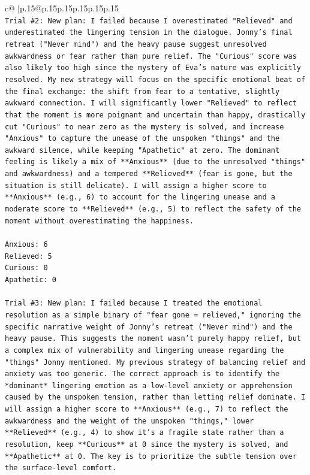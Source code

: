 \documentclass{article}
\begin{document}
{\begin{supertabular}{c@{$\;$}|p{.15\linewidth}@{}p{.15\linewidth}p{.15\linewidth}p{.15\linewidth}p{.15\linewidth}p{.15\linewidth}}
{{{\\ 
\texttt{Trial \#2: New plan: I failed because I overestimated "Relieved" and underestimated the lingering tension in the dialogue. Jonny's final retreat ("Never mind") and the heavy pause suggest unresolved awkwardness or fear rather than pure relief. The "Curious" score was also likely too high since the mystery of Eva's nature was explicitly resolved. My new strategy will focus on the specific emotional beat of the final exchange: the shift from fear to a tentative, slightly awkward connection. I will significantly lower "Relieved" to reflect that the moment is more poignant and uncertain than happy, drastically cut "Curious" to near zero as the mystery is solved, and increase "Anxious" to capture the unease of the unspoken "things" and the awkward silence, while keeping "Apathetic" at zero. The dominant feeling is likely a mix of **Anxious** (due to the unresolved "things" and awkwardness) and a tempered **Relieved** (fear is gone, but the situation is still delicate). I will assign a higher score to **Anxious** (e.g., 6) to account for the lingering unease and a moderate score to **Relieved** (e.g., 5) to reflect the safety of the moment without overestimating the happiness.} \\
\\ 
\texttt{Anxious: 6} \\
\texttt{Relieved: 5} \\
\texttt{Curious: 0} \\
\texttt{Apathetic: 0} \\
\\ 
\texttt{Trial \#3: New plan: I failed because I treated the emotional resolution as a simple binary of "fear gone = relieved," ignoring the specific narrative weight of Jonny's retreat ("Never mind") and the heavy pause. This suggests the moment wasn't purely happy relief, but a complex mix of vulnerability and lingering unease regarding the "things" Jonny mentioned. My previous strategy of balancing relief and anxiety was too generic. The correct approach is to identify the *dominant* lingering emotion as a low{-}level anxiety or apprehension caused by the unspoken tension, rather than letting relief dominate. I will assign a higher score to **Anxious** (e.g., 7) to reflect the awkwardness and the weight of the unspoken "things," lower **Relieved** (e.g., 4) to show it's a fragile state rather than a resolution, keep **Curious** at 0 since the mystery is solved, and **Apathetic** at 0. The key is to prioritize the subtle tension over the surface{-}level comfort.} \\
}}}
\end{supertabular}}
\end{document}
